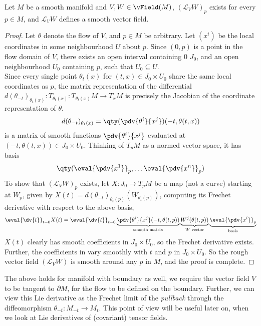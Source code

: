 \documentclass[../main-v2-manifolds.tex]{subfiles}
\begin{document}
\begin{wts}\label{lee-chp9:lemma-9.36} %
    Let $M$ be a smooth manifold and $V,W\in \vField(M)$, $(\mathcal{L}_V W)_p$ exists for every $p\in M$, and $\mathcal{L}_V W$ defines a smooth vector field.
\end{wts}
\begin{proof}
    Let $\theta$ denote the flow of $V$, and $p\in M$ be arbitrary. Let $(x^i)$ be the local coordinates in some neighbourhood $U$ about $p$. Since $(0,p)$ is a point in the flow domain of $V$, there exists an open interval containing $0$ $J_0$, and an open neighbourhood $U_0$ containing $p$, such that $U_0\subseteq U$.\\
    Since every single point $\theta_t(x)$ for $(t,x)\in J_0\times U_0$ share the same local coordinates as $p$, the matrix representation of the differential $d(\theta_{-t})_{\theta_t(x)}: T_{\theta_t(x)}: T_{\theta_t(x)}M \to T_{x}M$ is precisely the Jacobian of the coordinate representation of $\theta$. 
    \[
        d(\theta_{-t})_{\theta_t(x)} = \qty( \pdv{\theta^i}{x^j}) (-t,\theta(t,x))
    \]
    is a matrix of smooth functions $\pdv{\theta^i}{x^j}$ evaluated at $(-t,\theta(t,x))\in J_0\times U_0$. Thinking of $T_pM$ as a normed vector space, it has basis 
    \[
        \qty(\eval{\pdv{x^1}}_p,\ldots \eval{\pdv{x^n}}_p)
    \]
    To show that $(\mathcal{L}_V W)_p$ exists, let $X: J_0\to T_pM$ be a map (not a curve) starting at $W_p$, given by $X(t) = d(\theta_{-t})_{\theta_t(p)}(W_{\theta_t(p)})$, computing its Frechet derivative with respect to the above basis,
    \begin{equation}\label{lee-9.36-coefficients}
        \eval{\dv{t}}_{t=0} X(t) = \eval{\dv{t}}_{t=0} \underbrace{\pdv{\theta^i}{x^j}(-t,\theta(t,p))}_{\text{smooth matrix}} \underbrace{W^j(\theta(t,p))}_{W\text{ vector}} \underbrace{\eval{\pdv{x^i}}_{p}}_{\text{basis}}
    \end{equation}
    $X(t)$ clearly has smooth coefficients in $J_0\times U_0$, so the Frechet derivative exists. Further, the coefficients in  vary smoothly with $t$ and $p$ in $J_0\times U_0$. So the rough vector field $(\mathcal{L}_VW)$ is smooth around any $p$ in $M$, and the proof is complete.
\end{proof}
\begin{remark}
    The above holds for manifold with boundary as well, we require the vector field $V$ to be tangent to $\partial M$, for the flow to be defined on the boundary. Further, we can view this Lie derivative as the Frechet limit of the \emph{pullback} through the diffeomorphism $\theta_{-t}: M_{-t}\to M_{t}$. This point of view will be useful later on, when we look at Lie derivatives of (covariant) tensor fields.
\end{remark}
\end{document}
